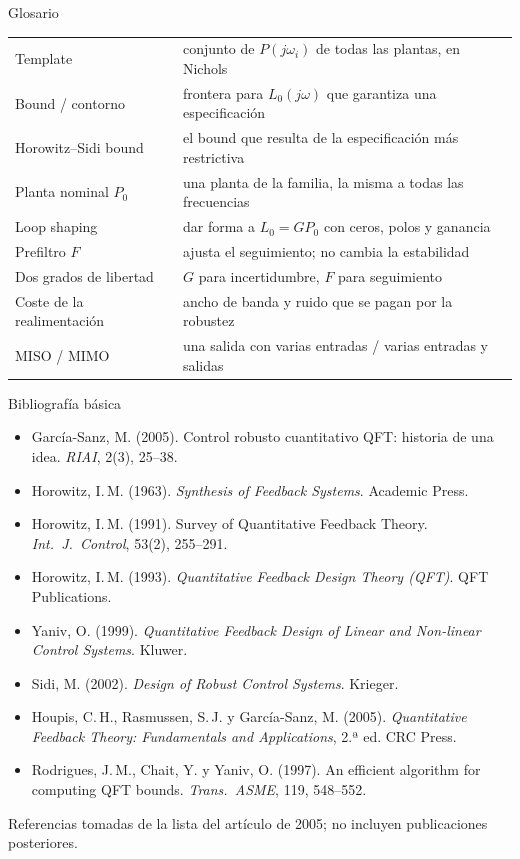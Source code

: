 \documentclass[aspectratio=169,11pt]{beamer}
\begin{document}
\begin{frame}{Glosario}
  \footnotesize
  \begin{center}
  \begin{tabular}{ll}
    \hline
    Template & conjunto de $P(j\omega_i)$ de todas las plantas, en Nichols\\
    Bound / contorno & frontera para $L_0(j\omega)$ que garantiza una especificación\\
    Horowitz--Sidi bound & el bound que resulta de la especificación más restrictiva\\
    Planta nominal $P_0$ & una planta de la familia, la misma a todas las frecuencias\\
    Loop shaping & dar forma a $L_0=GP_0$ con ceros, polos y ganancia\\
    Prefiltro $F$ & ajusta el seguimiento; no cambia la estabilidad\\
    Dos grados de libertad & $G$ para incertidumbre, $F$ para seguimiento\\
    Coste de la realimentación & ancho de banda y ruido que se pagan por la robustez\\
    MISO / MIMO & una salida con varias entradas / varias entradas y salidas\\
    \hline
  \end{tabular}
  \end{center}
\end{frame}

\begin{frame}{Bibliografía básica}
  \footnotesize
  \begin{itemize}
    \item García-Sanz, M. (2005). Control robusto cuantitativo QFT: historia de una idea. \emph{RIAI}, 2(3), 25--38.
    \item Horowitz, I.\,M. (1963). \emph{Synthesis of Feedback Systems}. Academic Press.
    \item Horowitz, I.\,M. (1991). Survey of Quantitative Feedback Theory. \emph{Int.\ J.\ Control}, 53(2), 255--291.
    \item Horowitz, I.\,M. (1993). \emph{Quantitative Feedback Design Theory (QFT)}. QFT Publications.
    \item Yaniv, O. (1999). \emph{Quantitative Feedback Design of Linear and Non-linear Control Systems}. Kluwer.
    \item Sidi, M. (2002). \emph{Design of Robust Control Systems}. Krieger.
    \item Houpis, C.\,H., Rasmussen, S.\,J. y García-Sanz, M. (2005). \emph{Quantitative Feedback Theory: Fundamentals and Applications}, 2.ª ed. CRC Press.
    \item Rodrigues, J.\,M., Chait, Y. y Yaniv, O. (1997). An efficient algorithm for computing QFT bounds. \emph{Trans.\ ASME}, 119, 548--552.
  \end{itemize}
  \scriptsize Referencias tomadas de la lista del artículo de 2005; no incluyen publicaciones posteriores.
\end{frame}
\end{document}
